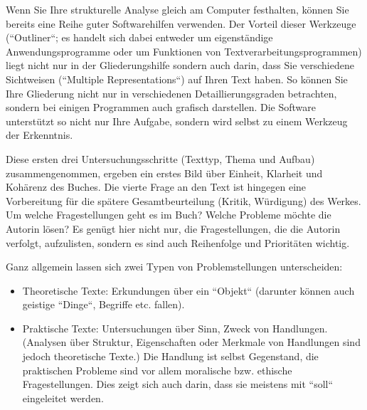 \documentclass[]{book}
\providecommand{\tightlist}{%
  \setlength{\itemsep}{0pt}\setlength{\parskip}{0pt}}
\theoremstyle{definition}
\theoremstyle{definition}
\theoremstyle{definition}
\theoremstyle{remark}
\begin{document}
Wenn Sie Ihre strukturelle Analyse gleich am Computer festhalten, können
Sie bereits eine Reihe guter Softwarehilfen verwenden. Der Vorteil
dieser Werkzeuge (``Outliner``; es handelt sich dabei entweder um
eigenständige Anwendungsprogramme oder um Funktionen von
Textverarbeitungsprogrammen) liegt nicht nur in der Gliederungshilfe
sondern auch darin, dass Sie verschiedene Sichtweisen (``Multiple
Representations``) auf Ihren Text haben. So können Sie Ihre Gliederung
nicht nur in verschiedenen Detaillierungsgraden betrachten, sondern bei
einigen Programmen auch grafisch darstellen. Die Software unterstützt so
nicht nur Ihre Aufgabe, sondern wird selbst zu einem Werkzeug der
Erkenntnis.

Diese ersten drei Untersuchungsschritte (Texttyp, Thema und Aufbau)
zusammengenommen, ergeben ein erstes Bild über Einheit, Klarheit und
Kohärenz des Buches. Die vierte Frage an den Text ist hingegen eine
Vorbereitung für die spätere Gesamtbeurteilung (Kritik, Würdigung) des
Werkes. Um welche Fragestellungen geht es im Buch? Welche Probleme
möchte die Autorin lösen? Es genügt hier nicht nur, die Fragestellungen,
die die Autorin verfolgt, aufzulisten, sondern es sind auch Reihenfolge
und Prioritäten wichtig.

Ganz allgemein lassen sich zwei Typen von Problemstellungen
unterscheiden:

\begin{itemize}
\tightlist
\item
  Theoretische Texte: Erkundungen über ein ``Objekt`` (darunter können
  auch geistige ``Dinge``, Begriffe etc. fallen).
\item
  Praktische Texte: Untersuchungen über Sinn, Zweck von Handlungen.
  (Analysen über Struktur, Eigenschaften oder Merkmale von Handlungen
  sind jedoch theoretische Texte.) Die Handlung ist selbst Gegenstand,
  die praktischen Probleme sind vor allem moralische bzw. ethische
  Fragestellungen. Dies zeigt sich auch darin, dass sie meistens mit
  ``soll`` eingeleitet werden.
\end{itemize}
\end{document}
